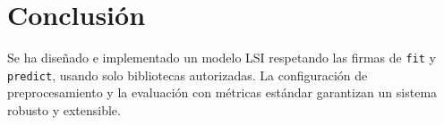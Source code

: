 \documentclass[12pt,a4paper]{report}
\begin{document}
\chapter{Conclusión}
Se ha diseñado e implementado un modelo LSI respetando las firmas de \texttt{fit} y \texttt{predict}, usando solo bibliotecas autorizadas. La configuración de preprocesamiento y la evaluación con métricas estándar garantizan un sistema robusto y extensible.
\end{document}
